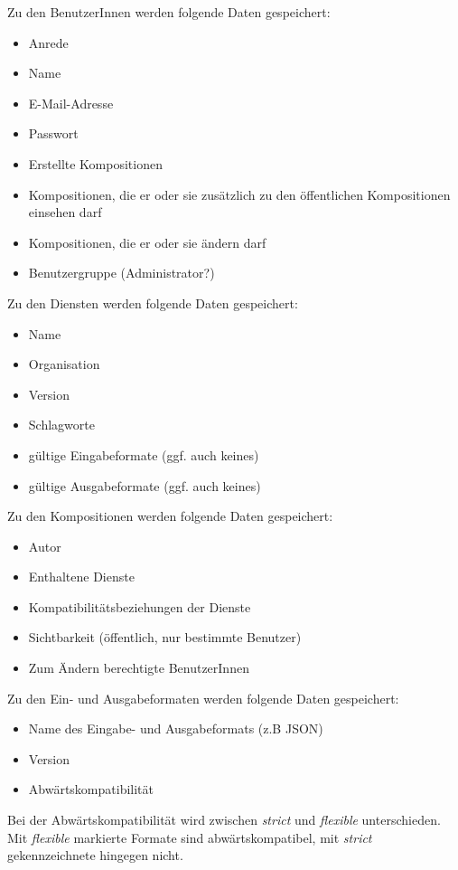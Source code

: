 Zu den BenutzerInnen werden folgende Daten gespeichert:
\begin{itemize}
	\item Anrede
	\item Name
	\item E-Mail-Adresse
	\item Passwort
	\item Erstellte Kompositionen
	\item Kompositionen, die er oder sie zusätzlich zu den öffentlichen Kompositionen einsehen darf
	\item Kompositionen, die er oder sie ändern darf
	\item Benutzergruppe (Administrator?)
\end{itemize}
Zu den Diensten werden folgende Daten gespeichert:
\begin{itemize}
	\item Name
	\item Organisation
	\item Version
	\item Schlagworte
	\item gültige Eingabeformate (ggf. auch keines)
	\item gültige Ausgabeformate (ggf. auch keines)
\end{itemize}
Zu den Kompositionen werden folgende Daten gespeichert:
\begin{itemize}
	\item Autor
	\item Enthaltene Dienste
	\item Kompatibilitätsbeziehungen der Dienste
	\item Sichtbarkeit (öffentlich, nur bestimmte Benutzer)
	\item Zum Ändern berechtigte BenutzerInnen
\end{itemize}

Zu den Ein- und Ausgabeformaten werden folgende Daten gespeichert:
\begin{itemize}
	\item Name des Eingabe- und Ausgabeformats (z.B JSON)
	\item Version
	\item Abwärtskompatibilität
\end{itemize}
Bei der Abwärtskompatibilität wird zwischen \textit{strict} und \textit{flexible} unterschieden. Mit \textit{flexible} markierte Formate sind abwärtskompatibel, mit \textit{strict} gekennzeichnete hingegen nicht.

